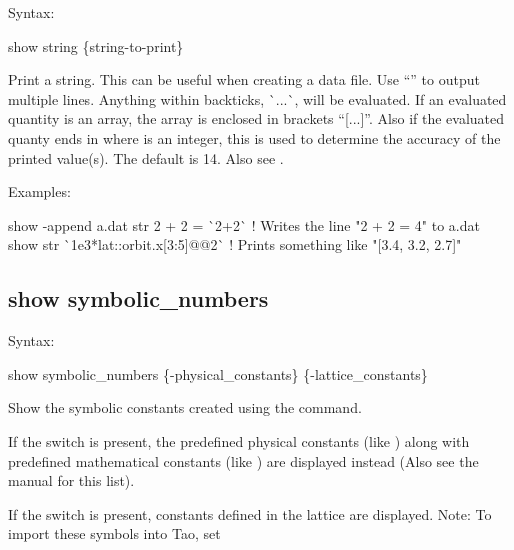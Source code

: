 {{{{{{{{{Syntax:
\begin{example}
  show string \{string-to-print\}
\end{example}

Print a string. This can be useful when creating a data file. Use ``'' to output multiple
lines. Anything within backticks, \`{}...\`{}, will be evaluated. If an evaluated quantity is an
array, the array is enclosed in brackets ``[...]''. Also if the evaluated quanty ends in
 where  is an integer, this is used to determine the accuracy of the printed
value(s). The default is 14. Also see .

Examples:
\begin{example}
  show -append a.dat str 2 + 2 = \`{}2+2\`{} ! Writes the line "2 + 2 = 4" to a.dat
  show str \`{}1e3*lat::orbit.x[3:5]@@2\`{}  ! Prints something like "[3.4, 3.2, 2.7]"
\end{example}


\subsection{show symbolic_numbers}
\label{s:show.symbolic}

Syntax:
\begin{example}
  show symbolic_numbers \{-physical_constants\} \{-lattice_constants\}
\end{example}

Show the symbolic constants created using the  command. 

If the  switch is present, the predefined physical constants (like
) along with predefined mathematical constants (like ) are displayed instead
(Also see the \bmad manual for this list).

If the  switch is present, constants defined in the lattice are displayed.
Note: To import these symbols into Tao, set \vn{global%
\vn{-symbol_import} switch on the startup command line). The default is to not import lattice
symbols.

Examples:
\begin{example}
  set sym aaa = 23  ! Set a symbol.
  show sym          ! Show all user defined symbols.
  show sym -phys    ! Show predefined physical and mathematical constants.
\end{example}

}}}}}}}}}}
